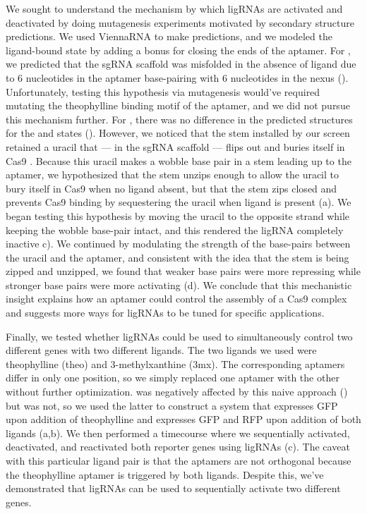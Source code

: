 \documentclass[10pt,oneside]{article}
\begin{document}
We sought to understand the mechanism by which ligRNAs are activated and deactivated by doing mutagenesis experiments motivated by \insilico{} secondary structure predictions.  We used ViennaRNA \autocite{lorenz2011} to make predictions, and we modeled the ligand-bound state by adding a  bonus for closing the ends of the aptamer.  For \ligrnaF{}, we predicted that the sgRNA scaffold was misfolded in the absence of ligand due to 6 nucleotides in the aptamer base-pairing with 6 nucleotides in the nexus ().  Unfortunately, testing this hypothesis via mutagenesis would've required mutating the theophylline binding motif of the aptamer, and we did not pursue this mechanism further.  For \ligrnaB{}, there was no difference in the predicted structures for the \apo{} and \holo{} states ().  However, we noticed that the stem installed by our screen retained a uracil that --- in the sgRNA scaffold --- flips out and buries itself in Cas9 \autocite{nishimasu2014}.  Because this uracil makes a wobble base pair in a stem leading up to the aptamer, we hypothesized that the stem unzips enough to allow the uracil to bury itself in Cas9 when no ligand absent, but that the stem zips closed and prevents Cas9 binding by sequestering the uracil when ligand is present (a).  We began testing this hypothesis by moving the uracil to the opposite strand while keeping the wobble base-pair intact, and this rendered the ligRNA completely inactive c).  We continued by modulating the strength of the base-pairs between the uracil and the aptamer, and consistent with the idea that the stem is being zipped and unzipped, we found that weaker base pairs were more repressing while stronger base pairs were more activating (d).  We conclude that this mechanistic insight explains how an aptamer could control the assembly of a Cas9 complex and suggests more ways for ligRNAs to be tuned for specific applications.


Finally, we tested whether ligRNAs could be used to simultaneously control two different genes with two different ligands.  The two ligands we used were theophylline (theo) and 3-methylxanthine (3mx).  The corresponding aptamers differ in only one position, so we simply replaced one aptamer with the other without further optimization.  \ligrnaF was negatively affected by this naive approach () but \ligrnaB was not, so we used the latter to construct a system that expresses GFP upon addition of theophylline and expresses GFP and RFP upon addition of both ligands (a,b).  We then performed a timecourse where we sequentially activated, deactivated, and reactivated both reporter genes using ligRNAs (c).  The caveat with this particular ligand pair is that the aptamers are not orthogonal because the theophylline aptamer is triggered by both ligands.  Despite this, we've demonstrated that ligRNAs can be used to sequentially activate two different genes.
\end{document}
